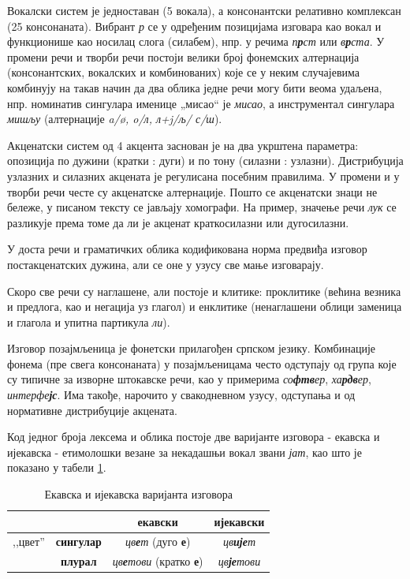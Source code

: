 {\begin{multicols}{2}
Вокалски систем је једноставан (5 вокала), а консонантски релативно комплексан (25 консонаната). Вибрант \textit{р} се у одређеним позицијама изговара као вокал и функционише као носилац слога (силабем), нпр. у речима \textit{п\textbf{р}ст} или \textit{в\textbf{р}ста}. У промени речи и творби речи постоји велики број фонемских алтернација (консонантских, вокалских и комбинованих) које се у неким случајевима комбинују на такав начин да два облика једне речи могу бити веома удаљена, нпр. номинатив сингулара именице „мисао“ је \textit{мисао}, а инструментал сингулара \textit{мишљу} (алтернације \textit{a/\o{}, o/л, л+j/љ/ с/ш}).

Акценатски систем од 4 акцента заснован је на два укрштена параметра: опозиција по дужини  (кратки : дуги) и по тону (силазни : узлазни).  Дистрибуција узлазних и силазних акцената је регулисана посебним правилима. У промени и у творби речи честе су акценатске алтернације. Пошто се акценатски знаци не бележе, у писаном тексту се јављају хомографи. На пример, значење речи \textit{лук} се разликује према томе да ли је акценат краткосилазни или дугосилазни.

У доста речи и граматичких облика кодификована норма предвиђа изговор постакценатских дужина, али се оне у узусу све мање изговарају.

Скоро све речи су наглашене, али постоје и клитике: проклитике (већина везника и предлога, као и негација уз глагол) и енклитике (ненаглашени облици заменица и глагола и упитна партикула \textit{ли}).

Изговор позајмљеница је фонетски прилагођен српском језику. Комбинације фонема (пре свега консонаната) у позајмљеницама често одступају од група које су типичне за изворне штокавске речи, као у примерима \textit{со\textbf{фтв}ер}, \textit{ха\textbf{рдв}ер}, \textit{интерфе\textbf{јс}}. Има такође, нарочито у свакодневном узусу, одступања и од нормативне дис\-три\-бу\-ци\-је акцената.

Код једног броја лексема и облика постоје две варијанте изговора - екавска и ијекавска - етимолошки везане за некадашњи вокал звани \textit{јат}, као што је показано у табели \ref{ekavski_ijekavski}. 


\begin{table}[ht]
\begin{center}
\begin{tabular}{|c|c|c|c|}
 \hline
  \multicolumn{2}{|c|}{} & {\textbf{екавски}} & {\textbf{ијекавски}} \\ 
   \hline
  {,,цвет''} & {\textbf{сингулар}} & \textit{цв\textbf{е}т} (дуго \textbf{е}) & \textit{цв\textbf{ије}т}\\ 
   \cline{2-4}
     & {\textbf{плурал}} & \textit{цв\textbf{е}тови} (кратко \textbf{е}) & \textit{цв\textbf{је}тови} \\
  \hline
 \end{tabular}
\end{center}
\caption{Екавска и ијекавска варијанта изговора}
\label{ekavski_ijekavski}
\end{table}


\end{multicols}}
